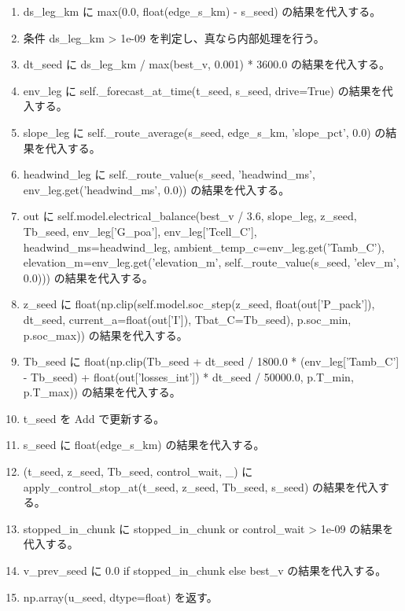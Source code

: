 \documentclass[a4paper,11pt]{article}
\begin{document}
\begin{enumerate}[leftmargin=1.8em]
\item     ds\_leg\_km に max(0.0, float(edge\_s\_km) - s\_seed) の結果を代入する。
\item     条件 ds\_leg\_km > 1e-09 を判定し、真なら内部処理を行う。
\item       dt\_seed に ds\_leg\_km / max(best\_v, 0.001) * 3600.0 の結果を代入する。
\item       env\_leg に self.\_forecast\_at\_time(t\_seed, s\_seed, drive=True) の結果を代入する。
\item       slope\_leg に self.\_route\_average(s\_seed, edge\_s\_km, 'slope\_pct', 0.0) の結果を代入する。
\item       headwind\_leg に self.\_route\_value(s\_seed, 'headwind\_ms', env\_leg.get('headwind\_ms', 0.0)) の結果を代入する。
\item       out に self.model.electrical\_balance(best\_v / 3.6, slope\_leg, z\_seed, Tb\_seed, env\_leg['G\_poa'], env\_leg['Tcell\_C'], headwind\_ms=headwind\_leg, ambient\_temp\_c=env\_leg.get('Tamb\_C'), elevation\_m=env\_leg.get('elevation\_m', self.\_route\_value(s\_seed, 'elev\_m', 0.0))) の結果を代入する。
\item       z\_seed に float(np.clip(self.model.soc\_step(z\_seed, float(out['P\_pack']), dt\_seed, current\_a=float(out['I']), Tbat\_C=Tb\_seed), p.soc\_min, p.soc\_max)) の結果を代入する。
\item       Tb\_seed に float(np.clip(Tb\_seed + dt\_seed / 1800.0 * (env\_leg['Tamb\_C'] - Tb\_seed) + float(out['losses\_int']) * dt\_seed / 50000.0, p.T\_min, p.T\_max)) の結果を代入する。
\item       t\_seed を Add で更新する。
\item       s\_seed に float(edge\_s\_km) の結果を代入する。
\item     (t\_seed, z\_seed, Tb\_seed, control\_wait, \_) に apply\_control\_stop\_at(t\_seed, z\_seed, Tb\_seed, s\_seed) の結果を代入する。
\item     stopped\_in\_chunk に stopped\_in\_chunk or control\_wait > 1e-09 の結果を代入する。
\item   v\_prev\_seed に 0.0 if stopped\_in\_chunk else best\_v の結果を代入する。
\item np.array(u\_seed, dtype=float) を返す。
            \end{enumerate}
\end{document}
